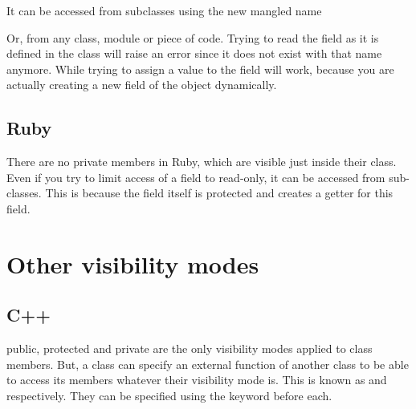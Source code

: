 \documentclass{KodeBook}
\begin{document}


It can be accessed from subclasses using the new mangled name



Or, from any class, module or piece of code. 
Trying to read the field as it is defined in the class will raise an error since it does not exist with that name anymore.
While trying to assign a value to the field will work, because you are actually creating a new field of the object dynamically.



\subsection{Ruby}

There are no private members in Ruby, which are visible just inside their class. 
Even if you try to limit access of a field to read-only, it can be accessed from sub-classes. 
This is because the field itself is protected and  creates a getter for this field. 





\section{Other visibility modes}

\subsection{C++}

public, protected and private are the only visibility modes applied to class members. 
But, a class can specify an external function of another class to be able to access its members whatever their visibility mode is. 
This is known as  and  respectively. 
They can be specified using the keyword  before each. 
\end{document}
